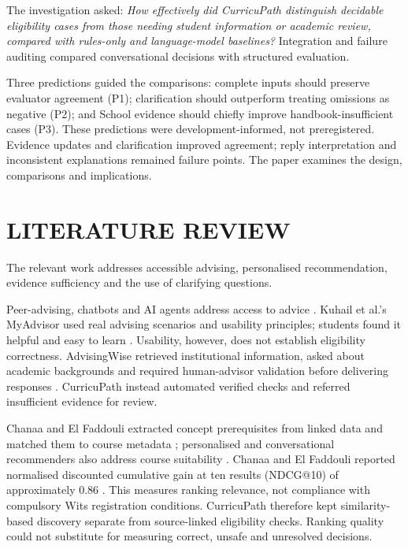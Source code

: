 The investigation asked: \emph{How effectively did CurricuPath distinguish decidable eligibility cases from those needing student information or academic review, compared with rules-only and language-model baselines?} Integration and failure auditing compared conversational decisions with structured evaluation.

Three predictions guided the comparisons: complete inputs should preserve evaluator agreement (P1); clarification should outperform treating omissions as negative (P2); and School evidence should chiefly improve handbook-insufficient cases (P3). These predictions were development-informed, not preregistered. Evidence updates and clarification improved agreement; reply interpretation and inconsistent explanations remained failure points. The paper examines the design, comparisons and implications.

\section{LITERATURE REVIEW}
The relevant work addresses accessible advising, personalised recommendation, evidence sufficiency and the use of clarifying questions.

\begin{samepage}
Peer-advising, chatbots and AI agents address access to advice \cite{empowered,khalil,tamas,nile,jiang}. Kuhail et al.'s MyAdvisor used real advising scenarios and usability principles; students found it helpful and easy to learn \cite{khalil}. Usability, however, does not establish eligibility correctness. AdvisingWise retrieved institutional information, asked about academic backgrounds and required human-advisor validation before delivering responses \cite{jiang}. CurricuPath instead automated verified checks and referred insufficient evidence for review.
\end{samepage}

Chanaa and El Faddouli extracted concept prerequisites from linked data and matched them to course metadata \cite{chawana}; personalised and conversational recommenders also address course suitability \cite{islam,ibrahim}. Chanaa and El Faddouli reported normalised discounted cumulative gain at ten results (NDCG@10) of approximately 0.86 \cite{chawana}. This measures ranking relevance, not compliance with compulsory Wits registration conditions. CurricuPath therefore kept similarity-based discovery separate from source-linked eligibility checks. Ranking quality could not substitute for measuring correct, unsafe and unresolved decisions.

